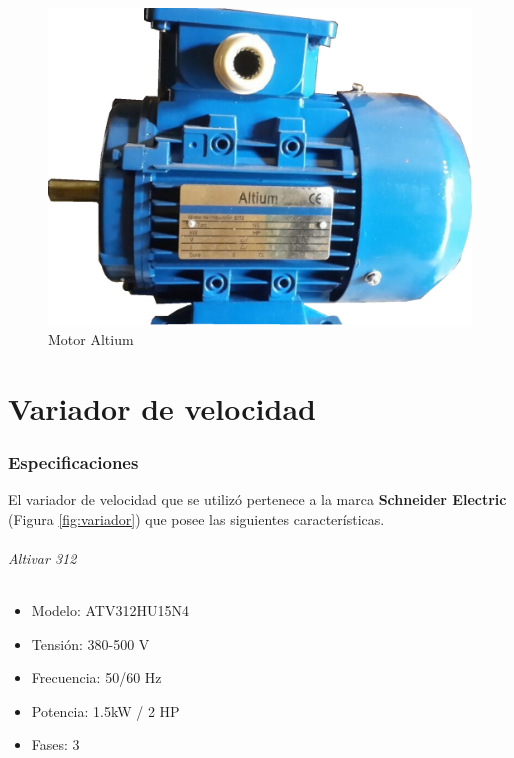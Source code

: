 \documentclass[12pt,a4paper]{article}
\begin{document}
	\begin{figure}[h!]
		\centering
		\includegraphics[scale=0.4]{motor.eps}
		\caption{Motor Altium}
		\label{fig:motor}
	\end{figure}
	
	
	\newpage
	\part{Variador de velocidad}
		\section{Especificaciones}
		El variador de velocidad que se utilizó pertenece a la marca \textbf{Schneider Electric} (Figura \ref{fig:variador}) que posee las siguientes características.
		\paragraph*{Altivar 312}
		\begin{itemize}
			\item 	Modelo: ATV312HU15N4
			\item   Tensión: 380-500 V
			\item 	Frecuencia: 50/60 Hz
			\item 	Potencia: 1.5kW / 2 HP
			\item 	Fases: 3
		\end{itemize}
\end{document}

